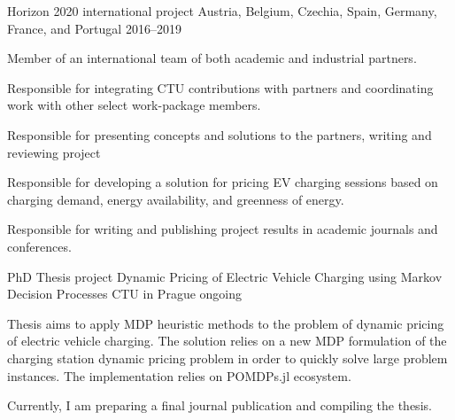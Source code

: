 

\begin{cventries}

  \cventry
    {Horizon 2020 international project} %
    {} %
    {Austria, Belgium, Czechia, Spain,  Germany, France, and Portugal} %
    {2016--2019} %
    {
      \begin{cvitems} %
        \item {Member of an international team of both academic and industrial partners.}
        \item {Responsible for integrating CTU contributions with partners and coordinating work with other select work-package members.}
        \item {Responsible for presenting concepts and solutions to the partners, writing and reviewing project }
        \item {Responsible for developing a solution for pricing EV charging sessions based on charging demand, energy availability, and greenness of energy.}
        \item {Responsible for writing and publishing project results in academic journals and conferences.}
      \end{cvitems}
    }

  \cventry
    {PhD Thesis project} %
    {Dynamic Pricing of Electric Vehicle Charging using Markov Decision Processes} %
    {CTU in Prague} %
    {ongoing} %
    {
      \begin{cvitems} %
        \item {Thesis aims to apply MDP heuristic methods to the problem of dynamic pricing of electric vehicle charging. The solution relies on a new MDP formulation of the charging station dynamic pricing problem in order to quickly solve large problem instances. The implementation relies on POMDPs.jl ecosystem.}
        \item {Currently, I am preparing a final journal publication and compiling the thesis.}
      \end{cvitems}
    }


\end{cventries}

